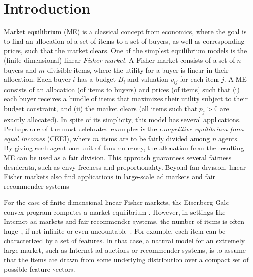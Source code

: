\section{Introduction}
Market equilibrium (ME) is a classical concept from economics, where the goal is to find an allocation of a set of items to a set of buyers, as well as corresponding prices, such that the market clears. 
One of the simplest equilibrium models is the (finite-dimensional) linear \emph{Fisher market}. A Fisher market consists of a set of $n$ buyers and $m$ divisible items, where the utility for a buyer is linear in their allocation.
Each buyer $i$ has a budget $B_i$ and valuation $v_{ij}$ for each item $j$. A ME consists of an allocation (of items to buyers) and prices (of items) such that (i) each buyer receives a bundle of items that maximizes their utility subject to their budget constraint, and (ii) the market clears (all items such that $p_j>0$ are exactly allocated).
In spite of its simplicity, this model has several applications. Perhaps one of the most celebrated examples is the \emph{competitive equilibrium from equal incomes} (CEEI), where  $m$ items are to be fairly divided among $n$ agents. By giving each agent one unit of faux currency, the allocation from the resulting ME can be used as a fair division. This approach guarantees several fairness desiderata, such as envy-freeness and proportionality. Beyond fair division, linear Fisher markets also find applications in large-scale ad markets \citep{conitzer2018multiplicative,conitzer2019pacing} and fair recommender systems \citep{kroer2019computing,kroer2019scalable}.

For the case of finite-dimensional linear Fisher markets, the Eisenberg-Gale convex program computes a market equilibrium \citep{eisenberg1959consensus,eisenberg1961aggregation}.
However, in settings like Internet ad markets and fair recommender systems, the number of items is often huge~\citep{kroer2019computing,kroer2019scalable}, if not infinite or even uncountable~\citep{balseiro2015repeated}. For example, each item can be characterized by a set of features.
In that case, a natural model for an extremely large market, such as Internet ad auctions or recommender systems, is to assume that the items are drawn from some underlying distribution over a compact set of possible feature vectors.

